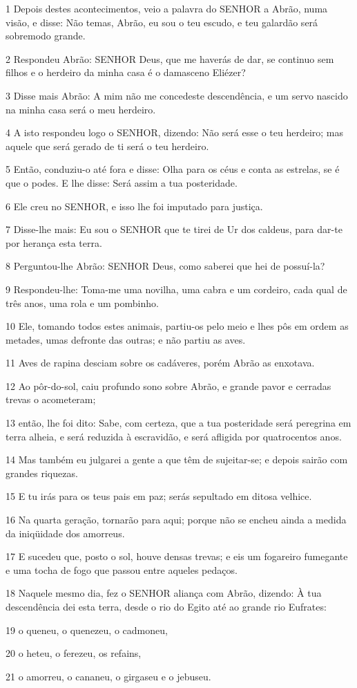 \par 1 Depois destes acontecimentos, veio a palavra do SENHOR a Abrão, numa visão, e disse: Não temas, Abrão, eu sou o teu escudo, e teu galardão será sobremodo grande.
\par 2 Respondeu Abrão: SENHOR Deus, que me haverás de dar, se continuo sem filhos e o herdeiro da minha casa é o damasceno Eliézer?
\par 3 Disse mais Abrão: A mim não me concedeste descendência, e um servo nascido na minha casa será o meu herdeiro.
\par 4 A isto respondeu logo o SENHOR, dizendo: Não será esse o teu herdeiro; mas aquele que será gerado de ti será o teu herdeiro.
\par 5 Então, conduziu-o até fora e disse: Olha para os céus e conta as estrelas, se é que o podes. E lhe disse: Será assim a tua posteridade.
\par 6 Ele creu no SENHOR, e isso lhe foi imputado para justiça.
\par 7 Disse-lhe mais: Eu sou o SENHOR que te tirei de Ur dos caldeus, para dar-te por herança esta terra.
\par 8 Perguntou-lhe Abrão: SENHOR Deus, como saberei que hei de possuí-la?
\par 9 Respondeu-lhe: Toma-me uma novilha, uma cabra e um cordeiro, cada qual de três anos, uma rola e um pombinho.
\par 10 Ele, tomando todos estes animais, partiu-os pelo meio e lhes pôs em ordem as metades, umas defronte das outras; e não partiu as aves.
\par 11 Aves de rapina desciam sobre os cadáveres, porém Abrão as enxotava.
\par 12 Ao pôr-do-sol, caiu profundo sono sobre Abrão, e grande pavor e cerradas trevas o acometeram;
\par 13 então, lhe foi dito: Sabe, com certeza, que a tua posteridade será peregrina em terra alheia, e será reduzida à escravidão, e será afligida por quatrocentos anos.
\par 14 Mas também eu julgarei a gente a que têm de sujeitar-se; e depois sairão com grandes riquezas.
\par 15 E tu irás para os teus pais em paz; serás sepultado em ditosa velhice.
\par 16 Na quarta geração, tornarão para aqui; porque não se encheu ainda a medida da iniqüidade dos amorreus.
\par 17 E sucedeu que, posto o sol, houve densas trevas; e eis um fogareiro fumegante e uma tocha de fogo que passou entre aqueles pedaços.
\par 18 Naquele mesmo dia, fez o SENHOR aliança com Abrão, dizendo: À tua descendência dei esta terra, desde o rio do Egito até ao grande rio Eufrates:
\par 19 o queneu, o quenezeu, o cadmoneu,
\par 20 o heteu, o ferezeu, os refains,
\par 21 o amorreu, o cananeu, o girgaseu e o jebuseu.

